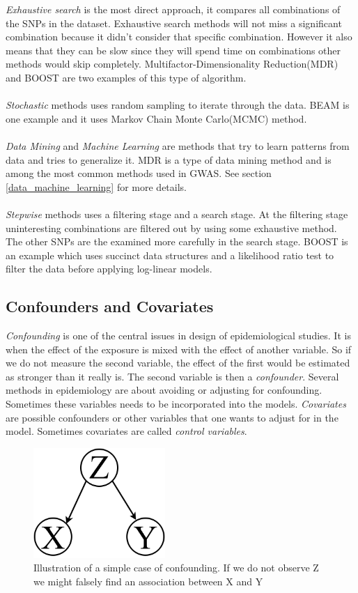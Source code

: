 \documentclass[10pt,a4paper]{report}
\newcounter{example}
\begin{document}
\emph{Exhaustive search} is the most direct approach, it compares all combinations of the SNPs in the dataset. Exhaustive search methods will not miss a significant combination because it didn't consider that specific combination. However it also means that they can be slow since they will spend time on combinations other methods would skip completely. Multifactor-Dimensionality Reduction(MDR)\cite{mdr_2001} and BOOST\cite{boost_gene_gene} are two examples of this type of algorithm.\\
\\
\emph{Stochastic} methods uses random sampling to iterate through the data. BEAM\cite{beam_2007} is one example and it uses Markov Chain Monte Carlo(MCMC) method.\\
\\
\emph{Data Mining} and \emph{Machine Learning} are methods that try to learn patterns from data and tries to generalize it. MDR\cite{mdr_2001} is a type of data mining method and is among the most common methods used in GWAS. See section \ref{data_machine_learning} for more details.\\
\\
\emph{Stepwise} methods uses a filtering stage and a search stage. At the filtering stage uninteresting combinations are filtered out by using some exhaustive method. The other SNPs are the examined more carefully in the search stage. BOOST\cite{boost_gene_gene} is an example which uses succinct data structures and a likelihood ratio test to filter the data before applying log-linear models.

\subsection{Confounders and Covariates}
\emph{Confounding} is one of the central issues in design of epidemiological studies. It is when the effect of the exposure is mixed with the effect of another variable. So if we do not measure the second variable, the effect of the first would be estimated as stronger than it really is. The second variable is then a \emph{confounder}. Several methods in epidemiology are about avoiding or adjusting for confounding. Sometimes these variables needs to be incorporated into the models. \emph{Covariates} are possible confounders or other variables that one wants to adjust for in the model. Sometimes covariates are called \emph{control variables}.\cite{rothman2002intro_epidemiology,rothman1998modern}

\begin{figure}[h]
    \centering
    \includegraphics[width=5cm]{Simple_Confounding_Case.png}
    \caption{Illustration of a simple case of confounding. If we do not observe Z we might falsely find an association between X and Y}
    \label{fig:confunding}
\end{figure}
\end{document}
